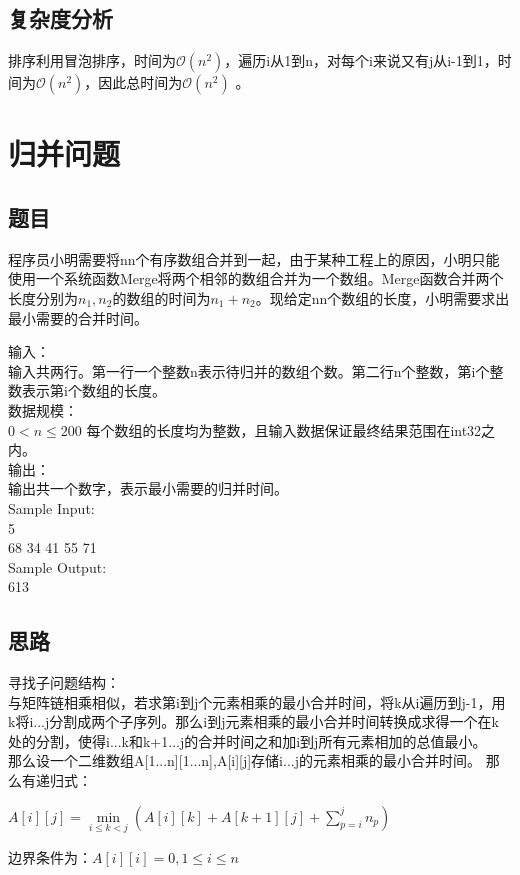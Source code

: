 \documentclass[UTF8]{ctexart}
\begin{document}
\subsection{复杂度分析}
排序利用冒泡排序，时间为$\mathcal{O}(n^2)$，遍历i从1到n，对每个i来说又有j从i-1到1，时间为$\mathcal{O}(n^2)$，因此总时间为$\mathcal{O}(n^2)$
。
\section{归并问题}
\subsection{题目}
程序员小明需要将nn个有序数组合并到一起，由于某种工程上的原因，小明只能使用一个系统函数Merge将两个相邻的数组合并为一个数组。Merge函数合并两个长度分别为$n_1,n_2$的数组的时间为$n_1+n_2$。现给定nn个数组的长度，小明需要求出最小需要的合并时间。

输入：\\
输入共两行。第一行一个整数n表示待归并的数组个数。第二行n个整数，第i个整数表示第i个数组的长度。\\

数据规模：\\
$0< n\leq 200$ 每个数组的长度均为整数，且输入数据保证最终结果范围在int32之内。\\


输出：\\
输出共一个数字，表示最小需要的归并时间。\\

Sample Input:\\
5\\
68 34 41 55 71 \\

Sample Output:\\
613\\

\subsection{思路}
寻找子问题结构：\\
与矩阵链相乘相似，若求第i到j个元素相乘的最小合并时间，将k从i遍历到j-1，用k将i...j分割成两个子序列。那么i到j元素相乘的最小合并时间转换成求得一个在k处的分割，使得i...k和k+1...j的合并时间之和加i到j所有元素相加的总值最小。\\
那么设一个二维数组A[1...n][1...n],A[i][j]存储i...j的元素相乘的最小合并时间。
那么有递归式：\\
\begin{center}
$A[i][j]=\min\limits_{i\leq k <j}(A[i][k]+A[k+1][j]+\sum_{p=i}^jn_p)$
\end{center}
边界条件为：$A[i][i]=0,1\leq i \leq n$
\end{document}
